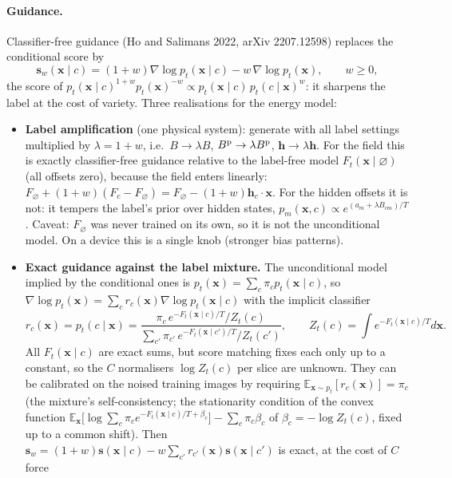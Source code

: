 \documentclass[11pt,a4paper]{article}
\newcommand{\vx}{\bm{x}}
\newcommand{\E}{\mathbb{E}}
\newcommand{\grad}{\nabla}
\begin{document}
\paragraph{Guidance.} Classifier-free guidance (Ho and Salimans 2022, arXiv 2207.12598) replaces the conditional
score by
\begin{equation}
  \bm s_w(\vx\mid c)=(1+w)\grad\log p_t(\vx\mid c)-w\,\grad\log p_t(\vx),\qquad w\ge0,
\end{equation}
the score of $p_t(\vx\mid c)^{1+w}p_t(\vx)^{-w}\propto p_t(\vx\mid c)\,p_t(c\mid\vx)^w$: it sharpens the label at the
cost of variety. Three realisations for the energy model:
\begin{itemize}
\item \textbf{Label amplification} (one physical system): generate with all label settings multiplied by
  $\lambda=1+w$, i.e.\ $B\to\lambda B$, $B^{\rm p}\to\lambda B^{\rm p}$, $\bm h\to\lambda\bm h$. For the field this is
  exactly classifier-free guidance relative to the label-free model $F_t(\vx\mid\varnothing)$ (all offsets zero),
  because the field enters linearly: $F_\varnothing+(1+w)(F_c-F_\varnothing)=F_\varnothing-(1+w)\bm h_c\cdot\vx$. For
  the hidden offsets it is not: it tempers the label's prior over hidden states,
  $p_m(\vx,c)\propto e^{(a_m+\lambda B_{cm})/T}$. Caveat: $F_\varnothing$ was never trained on its own, so it is not
  the unconditional model. On a device this is a single knob (stronger bias patterns).
\item \textbf{Exact guidance against the label mixture.} The unconditional model implied by the conditional ones
  is $p_t(\vx)=\sum_c\pi_cp_t(\vx\mid c)$, so $\grad\log p_t(\vx)=\sum_cr_c(\vx)\grad\log p_t(\vx\mid c)$ with the
  implicit classifier
  \begin{equation}
    r_c(\vx)=p_t(c\mid\vx)=\frac{\pi_c\,e^{-F_t(\vx\mid c)/T}/Z_t(c)}{\sum_{c'}\pi_{c'}\,e^{-F_t(\vx\mid c')/T}/Z_t(c')} ,
    \qquad Z_t(c)=\int e^{-F_t(\vx\mid c)/T}d\vx .
  \end{equation}
  All $F_t(\vx\mid c)$ are exact sums, but score matching fixes each only up to a constant, so the $C$ normalisers
  $\log Z_t(c)$ per slice are unknown. They can be calibrated on the noised training images by requiring
  $\E_{\vx\sim p_t}[r_c(\vx)]=\pi_c$ (the mixture's self-consistency; the stationarity condition of the convex
  function $\E_{\vx}\big[\log\sum_c\pi_ce^{-F_t(\vx\mid c)/T+\beta_c}\big]-\sum_c\pi_c\beta_c$ of $\beta_c=-\log Z_t(c)$, fixed up to a common shift). Then
  $\bm s_w=(1+w)\bm s(\vx\mid c)-w\sum_{c'}r_{c'}(\vx)\bm s(\vx\mid c')$ is exact, at the cost of $C$ force

\end{itemize}
\end{document}
